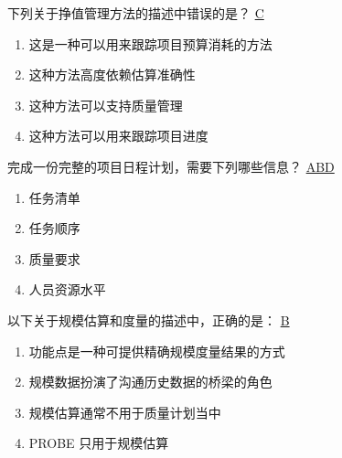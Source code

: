 \begin{problem}
	下列关于挣值管理方法的描述中错误的是？
	\uline{C}    
    \vspace{-0.8em}
    \begin{multicols}{2}
        \begin{enumerate}[label=\Alph*.]
            \item 这是一种可以用来跟踪项目预算消耗的方法
            \item 这种方法高度依赖估算准确性
            \item 这种方法可以支持质量管理
            \item 这种方法可以用来跟踪项目进度
        \end{enumerate}
    \end{multicols}
    \vspace{-1em}
\end{problem}



\begin{problem}
	完成一份完整的项目日程计划，需要下列哪些信息？
	\uline{ABD}    
    \vspace{-0.8em}
    \begin{multicols}{4}
        \begin{enumerate}[label=\Alph*.]
            \item 任务清单
            \item 任务顺序
            \item 质量要求
            \item 人员资源水平
        \end{enumerate}
    \end{multicols}
    \vspace{-1em}
\end{problem}




\begin{problem}
	以下关于规模估算和度量的描述中，正确的是：
	\uline{B}    
    \vspace{-0.8em}
    \begin{multicols}{2}
        \begin{enumerate}[label=\Alph*.]
            \item 功能点是一种可提供精确规模度量结果的方式
            \item 规模数据扮演了沟通历史数据的桥梁的角色
            \item 规模估算通常不用于质量计划当中
            \item PROBE 只用于规模估算
        \end{enumerate}
    \end{multicols}
    \vspace{-1em}
\end{problem}

